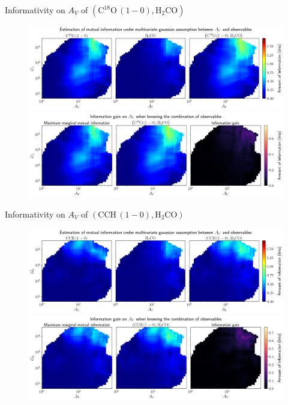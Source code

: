 \documentclass{beamer}
\begin{document}
\begin{frame}{Informativity on $A_V$ of $\left(\mathrm{C^{18}O\,(1-0)},\mathrm{H_2CO}\right)$}
    \begin{figure}
        \centering
        \includegraphics[width=0.95\linewidth]{../linearinfogauss/av__c18o10_h2co_linearinfogauss.png}
        \vfill
        \includegraphics[width=0.95\linewidth]{../linearinfogauss/av__c18o10_h2co_linearinfogauss_gain.png}
    \end{figure}
\end{frame}

\begin{frame}{Informativity on $A_V$ of $\left(\mathrm{CCH\,(1-0)},\mathrm{H_2CO}\right)$}
    \begin{figure}
        \centering
        \includegraphics[width=0.95\linewidth]{../linearinfogauss/av__cch10_h2co_linearinfogauss.png}
        \vfill
        \includegraphics[width=0.95\linewidth]{../linearinfogauss/av__cch10_h2co_linearinfogauss_gain.png}
    \end{figure}
\end{frame}
\end{document}
